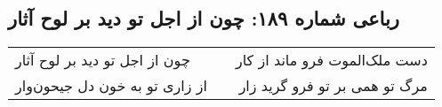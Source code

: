 \begin{center}
\section*{رباعی شماره ۱۸۹: چون از اجل تو دید بر لوح آثار}
\label{sec:sh189}
\begin{longtable}{l p{0.5cm} r}
چون از اجل تو دید بر لوح آثار
&&
دست ملک‌الموت فرو ماند از کار
\\
از زاری تو به خون دل جیحون‌وار
&&
مرگ تو همی بر تو فرو گرید زار
\\
\end{longtable}
\end{center}
